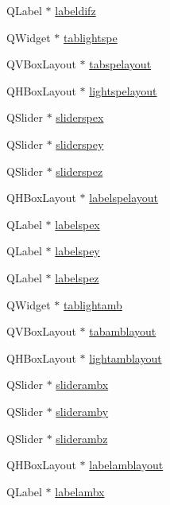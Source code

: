 \begin{DoxyCompactItemize}
Q\+Label $\ast$ \hyperlink{class_mondock_ac4418e6866dac5b4917ed73f43ccbcaa}{labeldifz}
\item 
Q\+Widget $\ast$ \hyperlink{class_mondock_a99dad8f1fa710a564d0e8348e992372e}{tablightspe}
\item 
Q\+V\+Box\+Layout $\ast$ \hyperlink{class_mondock_af59762fb339ae8c0821fada75433e8fb}{tabspelayout}
\item 
Q\+H\+Box\+Layout $\ast$ \hyperlink{class_mondock_a9d565bf7d99d0dc112fedc26f21abf2d}{lightspelayout}
\item 
Q\+Slider $\ast$ \hyperlink{class_mondock_abd032f6caee1a61430b8f37fdf872c55}{sliderspex}
\item 
Q\+Slider $\ast$ \hyperlink{class_mondock_ab99848143e6941f878cb9328681d7690}{sliderspey}
\item 
Q\+Slider $\ast$ \hyperlink{class_mondock_a496a2a2470c9c96599cd491608544bf6}{sliderspez}
\item 
Q\+H\+Box\+Layout $\ast$ \hyperlink{class_mondock_ad034a6a1d416711fd87e9594a33d9ae4}{labelspelayout}
\item 
Q\+Label $\ast$ \hyperlink{class_mondock_a9dcd6eacb52a58adddd1f0118dc7fc66}{labelspex}
\item 
Q\+Label $\ast$ \hyperlink{class_mondock_a51f3374b36482300513cfaa0d9e7cb44}{labelspey}
\item 
Q\+Label $\ast$ \hyperlink{class_mondock_af00a5126b8b2d537b5a46064b4d26d76}{labelspez}
\item 
Q\+Widget $\ast$ \hyperlink{class_mondock_a9033d2049c8fcdc628ef06ea8cb192ca}{tablightamb}
\item 
Q\+V\+Box\+Layout $\ast$ \hyperlink{class_mondock_a73f30ee1b770ddf08cdb854136ab4e51}{tabamblayout}
\item 
Q\+H\+Box\+Layout $\ast$ \hyperlink{class_mondock_ada46a57b4e681dc6f9420ae74f46fefc}{lightamblayout}
\item 
Q\+Slider $\ast$ \hyperlink{class_mondock_a51c280e3a1dae1f368e9028069afb424}{sliderambx}
\item 
Q\+Slider $\ast$ \hyperlink{class_mondock_ac6a5fbe64fd9a0567ae84e9ec5244fbd}{slideramby}
\item 
Q\+Slider $\ast$ \hyperlink{class_mondock_aa90503d09eeebd2f51e15a416c6424c7}{sliderambz}
\item 
Q\+H\+Box\+Layout $\ast$ \hyperlink{class_mondock_a8726f8f74256a666684740d03747ad5a}{labelamblayout}
\item 
Q\+Label $\ast$ \hyperlink{class_mondock_af77614bc15448c7488db1b12a03162f5}{labelambx}
\item 

\end{DoxyCompactItemize}
